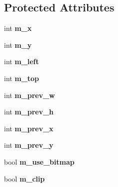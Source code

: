 \subsection*{Protected Attributes}
\begin{DoxyCompactItemize}
\item 
\hypertarget{class_plot_panel_abd0a64bd20aec2e300e383abfd60315d}{int {\bfseries m\-\_\-x}}\label{class_plot_panel_abd0a64bd20aec2e300e383abfd60315d}

\item 
\hypertarget{class_plot_panel_a822981fef8ff50da327b3dbca9fd2777}{int {\bfseries m\-\_\-y}}\label{class_plot_panel_a822981fef8ff50da327b3dbca9fd2777}

\item 
\hypertarget{class_plot_panel_ab41676a2e46c2e801bc639c274a7d5f5}{int {\bfseries m\-\_\-left}}\label{class_plot_panel_ab41676a2e46c2e801bc639c274a7d5f5}

\item 
\hypertarget{class_plot_panel_a8c49969c560b64902272347835f151a0}{int {\bfseries m\-\_\-top}}\label{class_plot_panel_a8c49969c560b64902272347835f151a0}

\item 
\hypertarget{class_plot_panel_a398b423039df00405f2f23b786a02b0d}{int {\bfseries m\-\_\-prev\-\_\-w}}\label{class_plot_panel_a398b423039df00405f2f23b786a02b0d}

\item 
\hypertarget{class_plot_panel_af85cf51a62f09adf0cbb4eb35d7cfc97}{int {\bfseries m\-\_\-prev\-\_\-h}}\label{class_plot_panel_af85cf51a62f09adf0cbb4eb35d7cfc97}

\item 
\hypertarget{class_plot_panel_ab38a4323755a529cbdab28a5854ffc06}{int {\bfseries m\-\_\-prev\-\_\-x}}\label{class_plot_panel_ab38a4323755a529cbdab28a5854ffc06}

\item 
\hypertarget{class_plot_panel_a2e1ea18bbea07dd04acc76567a993070}{int {\bfseries m\-\_\-prev\-\_\-y}}\label{class_plot_panel_a2e1ea18bbea07dd04acc76567a993070}

\item 
\hypertarget{class_plot_panel_a20336cef42ecb91f0fd1f9af1f70ba43}{bool {\bfseries m\-\_\-use\-\_\-bitmap}}\label{class_plot_panel_a20336cef42ecb91f0fd1f9af1f70ba43}

\item 
\hypertarget{class_plot_panel_a07334de87de07eeab43eabbdaf730ab5}{bool {\bfseries m\-\_\-clip}}\label{class_plot_panel_a07334de87de07eeab43eabbdaf730ab5}


\end{DoxyCompactItemize}
